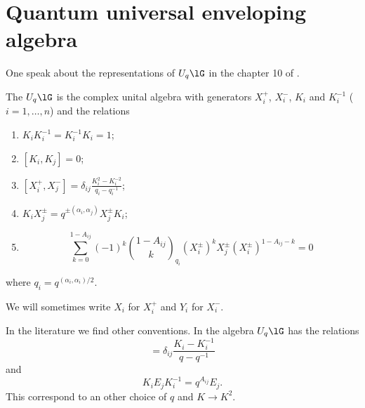 \section{Quantum universal enveloping algebra}
One speak about the representations of \( U_q\lG\) in the chapter 10 of \cite{GuideToQuantumGroups}.

\begin{definition}      \label{DefUqlG}
    The  \( U_q\lG\) is the complex unital algebra with generators \( X_i^+\), \( X_i^-\), \( K_i\) and \( K_i^{-1}\) (\( i=1,\ldots,n\)) and the relations
    \begin{enumerate}
        \item
            \( K_iK_i^{-1}=K_i^{-1}K_i=1\);
        \item
            \( [K_i,K_j]=0\);
        \item
            \( [X_i^+,X_j^-]=\delta_{ij}\frac{ K_i^2-K_i^{-2} }{ q_i-q_i^{-1} }\);
        \item       \label{EqUqlGdefiv}
            \( K_iX_j^{\pm}=q^{\pm(\alpha_i,\alpha_j)}X_j^{\pm}K_i\);
        \item
            \begin{equation}
                \sum_{k=0}^{1-A_{ij}}(-1)^k\binom{1-A_{ij}}{k}_{q_i}(X_i^{\pm})^kX_j^{\pm}(X_i^{\pm})^{1-A_{ij}-k}=0
            \end{equation}
    \end{enumerate}
    where \( q_i=q^{(\alpha_i,\alpha_i)/2}\).
\end{definition}
We will sometimes write \( X_i\) for \( X_i^+\) and \( Y_i\) for \( X_i^-\).

\begin{remark}
    In the literature we find other conventions. In \cite{Kassel} the algebra \( U_q\lG\) has the relations
    \begin{equation}
        [E_i,F_j]=\delta_{ij}\frac{ K_i-K_i^{-1} }{ q-q^{-1} } 
    \end{equation}
    and
    \begin{equation}
        K_iE_jK_i^{-1}=q^{A_{ij}}E_j.
    \end{equation}
    This correspond to an other choice of \( q\) and \( K\to K^2\).
\end{remark}

